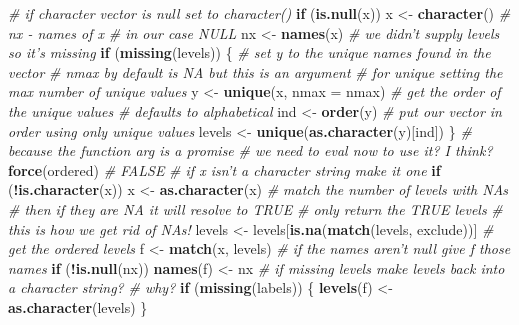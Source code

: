 \documentclass[]{book}
\newenvironment{Shaded}{\begin{snugshade}}{\end{snugshade}}
\newcommand{\CommentTok}[1]{\textcolor[rgb]{0.56,0.35,0.01}{\textit{#1}}}
\newcommand{\ControlFlowTok}[1]{\textcolor[rgb]{0.13,0.29,0.53}{\textbf{#1}}}
\newcommand{\DataTypeTok}[1]{\textcolor[rgb]{0.13,0.29,0.53}{#1}}
\newcommand{\KeywordTok}[1]{\textcolor[rgb]{0.13,0.29,0.53}{\textbf{#1}}}
\newcommand{\NormalTok}[1]{#1}
\newcommand{\OperatorTok}[1]{\textcolor[rgb]{0.81,0.36,0.00}{\textbf{#1}}}
\newcommand{\StringTok}[1]{\textcolor[rgb]{0.31,0.60,0.02}{#1}}
\begin{document}
\begin{Shaded}
\begin{Highlighting}[]
   \CommentTok{# if character vector is null set to character()}
  \ControlFlowTok{if}\NormalTok{ (}\KeywordTok{is.null}\NormalTok{(x)) }
\NormalTok{      x <-}\StringTok{ }\KeywordTok{character}\NormalTok{()}
  \CommentTok{# nx - names of x}
  \CommentTok{# in our case NULL}
\NormalTok{    nx <-}\StringTok{ }\KeywordTok{names}\NormalTok{(x)}
    \CommentTok{# we didn't supply levels so it's missing}
    \ControlFlowTok{if}\NormalTok{ (}\KeywordTok{missing}\NormalTok{(levels)) \{}
      \CommentTok{# set y to the unique names found in the vector}
      \CommentTok{# nmax by default is NA but this is an argument}
      \CommentTok{# for unique setting the max number of unique values}
\NormalTok{        y <-}\StringTok{ }\KeywordTok{unique}\NormalTok{(x, }\DataTypeTok{nmax =}\NormalTok{ nmax)}
        \CommentTok{# get the order of the unique values}
        \CommentTok{# defaults to alphabetical}
\NormalTok{        ind <-}\StringTok{ }\KeywordTok{order}\NormalTok{(y)}
        \CommentTok{# put our vector in order using only unique values}
\NormalTok{        levels <-}\StringTok{ }\KeywordTok{unique}\NormalTok{(}\KeywordTok{as.character}\NormalTok{(y)[ind])}
\NormalTok{    \}}
    \CommentTok{# because the function arg is a promise }
    \CommentTok{# we need to eval now to use it? I think?}
    \KeywordTok{force}\NormalTok{(ordered) }\CommentTok{# FALSE}
    \CommentTok{# if x isn't a character string make it one}
    \ControlFlowTok{if}\NormalTok{ (}\OperatorTok{!}\KeywordTok{is.character}\NormalTok{(x)) }
\NormalTok{        x <-}\StringTok{ }\KeywordTok{as.character}\NormalTok{(x)}
    \CommentTok{# match the number of levels with NAs}
    \CommentTok{# then if they are NA it will resolve to TRUE}
    \CommentTok{# only return the TRUE levels}
    \CommentTok{# this is how we get rid of NAs!}
\NormalTok{    levels <-}\StringTok{ }\NormalTok{levels[}\KeywordTok{is.na}\NormalTok{(}\KeywordTok{match}\NormalTok{(levels, exclude))]}
    \CommentTok{# get the ordered levels}
\NormalTok{    f <-}\StringTok{ }\KeywordTok{match}\NormalTok{(x, levels)}
    \CommentTok{# if the names aren't null give f those names}
    \ControlFlowTok{if}\NormalTok{ (}\OperatorTok{!}\KeywordTok{is.null}\NormalTok{(nx)) }
        \KeywordTok{names}\NormalTok{(f) <-}\StringTok{ }\NormalTok{nx}
    \CommentTok{# if missing levels make levels back into a character string?}
    \CommentTok{# why?}
    \ControlFlowTok{if}\NormalTok{ (}\KeywordTok{missing}\NormalTok{(labels)) \{}
        \KeywordTok{levels}\NormalTok{(f) <-}\StringTok{ }\KeywordTok{as.character}\NormalTok{(levels)}
\NormalTok{    \}}

\end{Highlighting}
\end{Shaded}
\end{document}
